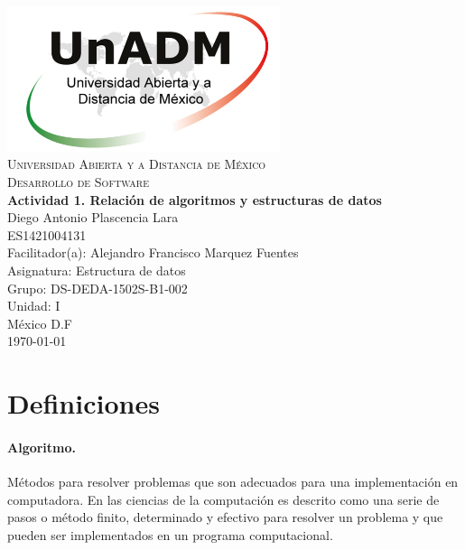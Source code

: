 \documentclass[spanish,12pt,letterpapper]{article}
\begin{document}
	\begin{titlepage}
		\begin{center}
			\includegraphics[width=0.6\textwidth]{./logoUnADM}~\\[1cm] 
			\textsc{Universidad Abierta y a Distancia de M\'exico}\\[0.8cm]
			\textsc{Desarrollo de Software}\\[1.8cm]
			
			\textbf{ \Large Actividad 1. Relaci\'on de algoritmos y estructuras de datos}\\[3cm]
			
			Diego Antonio Plascencia Lara\\ ES1421004131 \\[0.4cm]
			Facilitador(a): Alejandro Francisco Marquez Fuentes\\
			Asignatura: Estructura de datos\\
			Grupo: DS-DEDA-1502S-B1-002 \\
			Unidad: I \\
			
			\vfill M\'exico D.F\\{\today}
			
		\end{center}
	\end{titlepage}
	
	\section{Definiciones \\[1cm]}
	
	\paragraph{Algoritmo.}
	M\'etodos para resolver problemas que son adecuados para una implementaci\'on en computadora. En las ciencias de la computaci\'on es descrito como una serie de pasos o m\'etodo finito, determinado y efectivo para resolver un problema y que pueden ser implementados en un programa computacional.
	
\end{document}
